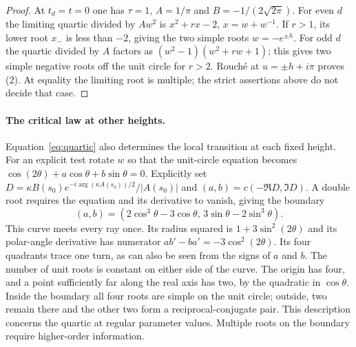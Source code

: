 \begin{proof}
At $t_d=t=0$ one has $\tau=1$, $A=1/\pi$ and
$B=-1/(2\sqrt{2\pi})$. For even $d$ the limiting quartic divided
by $A w^2$ is $x^2+r x-2$, $x=w+w^{-1}$. If $r>1$, its lower
root $x_-$ is less than $-2$, giving the two simple roots
$w=-e^{\pm h}$. For odd $d$ the quartic divided by $A$ factors as
$(w^2-1)(w^2+r w+1)$; this gives two simple negative roots off the
unit circle for $r>2$. Rouch\'e at $u=\pm h+i\pi$ proves (2).
At equality the limiting root is multiple; the strict assertions above
do not decide that case.
\end{proof}

\paragraph{The critical law at other heights.}
Equation~\eqref{eq:quartic} also determines the local transition at each
fixed height. For an explicit test rotate $w$ so that the unit-circle
equation becomes $\cos(2\theta)+a\cos\theta+b\sin\theta=0$.
Explicitly set $D=\kappa B(s_0)e^{-i\arg(\kappa A(s_0))/2}/|A(s_0)|$
and $(a,b)=c(-\Re D,\Im D)$. A double root requires the equation and
its derivative to vanish, giving the boundary
\[
 (a,b)=(2\cos^3\theta-3\cos\theta,\,
              3\sin\theta-2\sin^3\theta).
\]
This curve meets every ray once. Its radius squared is
$1+3\sin^2(2\theta)$ and its polar-angle derivative has numerator
$ab'-ba'=-3\cos^2(2\theta)$. Its four quadrants trace one turn, as
can also be seen from the signs of $a$ and $b$. The number of unit
roots is constant on either side of the curve. The origin has four,
and a point sufficiently far along the real axis has two, by the
quadratic in $\cos\theta$. Inside the boundary all four roots are
simple on the unit circle; outside, two remain there and the other
two form a reciprocal-conjugate pair. This description concerns
the quartic at regular parameter values. Multiple roots on the
boundary require higher-order information.
